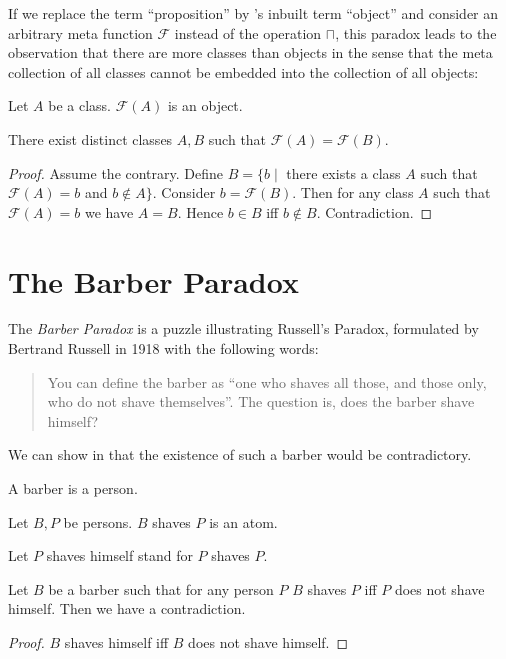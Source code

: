 \documentclass{article}
\newcommand{\F}{\mathcal{F}}
\begin{document}
  If we replace the term ``proposition'' by \Naproche's inbuilt term ``object''
  and consider an arbitrary meta function $\F$ instead of the operation
  $\sqcap$, this paradox leads to the observation that there are more classes
  than objects in the sense that the meta collection of all classes cannot be
  embedded into the collection of all objects:

  \begin{forthel}
    \begin{signature*}
      Let $A$ be a class.
      $\F(A)$ is an object.
    \end{signature*}

    \begin{theorem*}
      There exist distinct classes $A, B$ such that $\F(A) =
      \F(B)$.
    \end{theorem*}
    \begin{proof}
      Assume the contrary.
      Define $B = \{ b \mid$ there exists a class $A$ such that $\F(A) = b$ and
      $b \notin A \}$.
      Consider $b = \F(B)$.
      Then for any class $A$ such that $\F(A) = b$ we have $A = B$.
      Hence $b \in B$ iff $b \notin B$.
      Contradiction.
    \end{proof}
  \end{forthel}


  \section*{The Barber Paradox}

  The \emph{Barber Paradox} is a puzzle illustrating Russell's Paradox,
  formulated by Bertrand Russell in 1918 with the following words:

  \begin{quotation}
    \noindent You can define the barber as \enquote{one who shaves all those,
    and those only, who do not shave themselves}.
    The question is, does the barber shave himself?
  \end{quotation}

  \noindent We can show in \Naproche that the existence of such a barber would
  be contradictory.

  \begin{forthel}
    \begin{signature*}
      A barber is a person.
    \end{signature*}

    \begin{signature*}
      Let $B, P$ be persons.
      $B$ shaves $P$ is an atom.
    \end{signature*}

    Let $P$ shaves himself stand for $P$ shaves $P$.

    \begin{theorem*}
      Let $B$ be a barber such that for any person $P$ $B$ shaves $P$ iff $P$
      does not shave himself.
      Then we have a contradiction.
    \end{theorem*}
    \begin{proof}
      $B$ shaves himself iff $B$ does not shave himself.
    \end{proof}
  \end{forthel}
\end{document}
